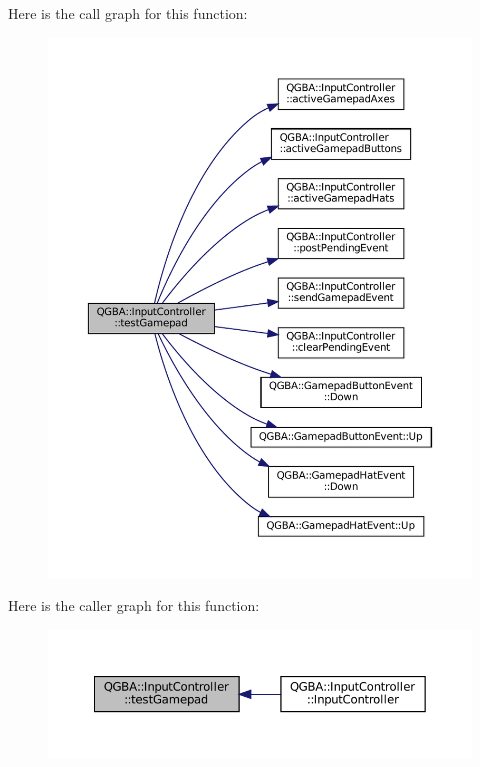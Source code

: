 Here is the call graph for this function\+:
\nopagebreak
\begin{figure}[H]
\begin{center}
\leavevmode
\includegraphics[width=350pt]{class_q_g_b_a_1_1_input_controller_abd049f5661c769b2d4981b0a28e95221_cgraph}
\end{center}
\end{figure}
Here is the caller graph for this function\+:
\nopagebreak
\begin{figure}[H]
\begin{center}
\leavevmode
\includegraphics[width=350pt]{class_q_g_b_a_1_1_input_controller_abd049f5661c769b2d4981b0a28e95221_icgraph}
\end{center}
\end{figure}
\mbox{\label{class_q_g_b_a_1_1_input_controller_a2f6fe03cf89c5336efe121c65c95309e}} 
